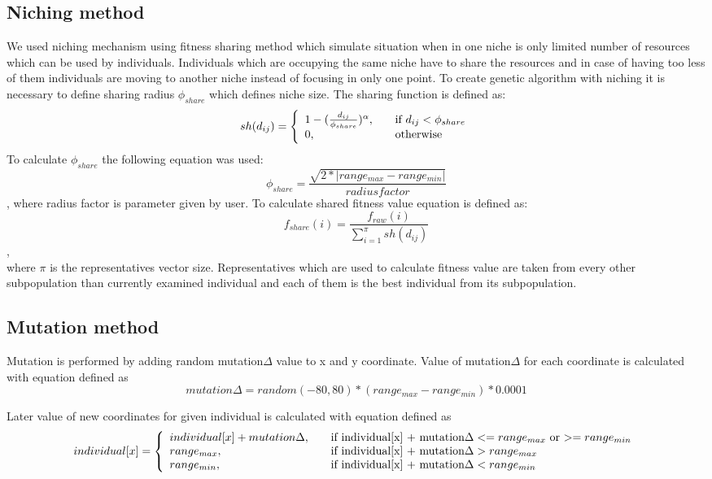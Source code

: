 \documentclass[a4paper]{article}
\begin{document}
\subsection{Niching method}
We used niching mechanism using fitness sharing method which simulate situation when in one niche is only limited number of resources which can be used by individuals. 
Individuals which are occupying the same niche have to share the resources and in case of having too less of them individuals are moving to another niche instead of 
focusing in only one point. To create genetic algorithm with niching it is necessary to define sharing radius $\phi_{share}$ which defines niche size.
The sharing function is defined as:
\[ sh(d_{ij}) = \left
\{\begin{array}{l l}
    1 - (\frac{d_{ij}}{\phi_{share}})^\alpha, & \quad \text{if $d_{ij} < \phi_{share}$}\\
    0, & \quad \text{otherwise}
  \end{array} \right.\]
To calculate $\phi_{share}$ the following equation was used: \\
\[\phi_{share} = \frac{\sqrt{2*|range_{max}-range_{min}|}}{radius factor}\],
where radius factor is parameter given by user.
To calculate shared fitness value equation is defined as:\\
\[f_{share}(i) = \frac{f_{raw}(i)}{\sum_{i=1}^{\pi}sh(d_{ij})}\], \\
where $\pi$ is the representatives vector size. 
Representatives which are used to calculate fitness value are taken from every other subpopulation than currently examined individual and each of them is the best individual from its subpopulation.

\subsection{Mutation method}
Mutation is performed by adding random mutation$\Delta$ value to x and y coordinate. Value of mutation$\Delta$ for each coordinate is calculated with equation defined as
\[mutation\Delta = random(-80, 80)*(range_{max}-range_{min})*0.0001\]

Later value of new coordinates for given individual is calculated with equation defined as\\

\[ individual[x] = \left
\{\begin{array}{l l}
    individual[x] + mutation\Delta, & \quad \text{if individual[x] + mutation$\Delta <= range_{max}$ or $>= range_{min}$}\\
    range_{max}, & \quad \text{if individual[x] + mutation$\Delta > range_{max}$}\\
    range_{min}, & \quad \text{if individual[x] + mutation$\Delta < range_{min}$}
  \end{array} \right.\]
\end{document}
